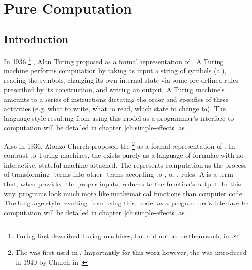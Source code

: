 \chapter{Pure Computation}
\label{ch:introduction}

\section{Introduction}


In 1936%
\footnote{
  Turing first described Turing machines, but did not name them such, in \cite{Turing1936}.
}%
, Alan Turing proposed  as a formal representation of .
A Turing machine performs computation by taking as input a string of symbols (a ), reading the symbols, changing its own internal state via some pre-defined rules prescribed by its construction, and writing an output.
A Turing machine's  amounts to a series of instructions dictating the order and specifics of these activities (e.g. what to write, what to read, which state to change to).
The language style resulting from using this model as a programmer's interface to computation will be detailed in chapter~\ref{ch:simple-effects} as .

Also in 1936, Alonzo Church proposed the \ep{\lc}%
\footnote{
  The \ep{\lc} was first used in \cite{Church1936}.
  Importantly for this work however, the  was introduced in 1940 by Church in \cite{Church1940}.
}
as a formal representation of .
In contrast to Turing machines, the \lc exists purely as a language of formulae with no interactive, stateful machine attached.
The \lc represents computation as the process of transforming \lc-terms into other \lc-terms according to , or , rules.
A \lc {} is a term that, when provided the proper inputs, reduces to the function's output.
In this way, \lc programs look much more like mathematical functions than computer code.
The language style resulting from using this model as a programmer's interface to computation will be detailed in chapter~\ref{ch:simple-effects} as .

